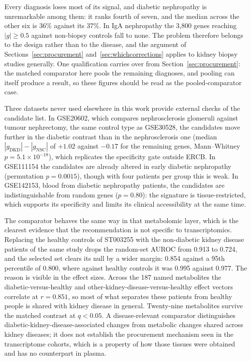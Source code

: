 \documentclass[pdflatex,sn-vancouver-num]{sn-jnl}
\theoremstyle{thmstyleone}
\theoremstyle{thmstyletwo}
\theoremstyle{thmstylethree}
\begin{document}
Every diagnosis loses most of its signal, and diabetic nephropathy is unremarkable among them:
it ranks fourth of seven, and the median across the other six is 36\% against its 37\%. In IgA
nephropathy the 3,800 genes reaching $|g| \ge 0.5$ against non-biopsy controls fall to none.
The problem therefore belongs to the design rather than to the disease, and the argument of
Sections~\ref{sec:procurement} and~\ref{sec:whichcorrections} applies to kidney biopsy studies
generally. One qualification carries over from Section~\ref{sec:procurement}: the matched
comparator here pools the remaining diagnoses, and pooling can itself produce a result, so these
figures should be read as the pooled-comparator case.

Three datasets never used elsewhere in this work provide external checks of the candidate list.
In GSE20602, which compares nephrosclerosis glomeruli against tumour nephrectomy, the same
control type as GSE30528, the candidates move further in the diabetic contrast than in the
nephrosclerosis one (median $|g_{\text{DKD}}| - |g_{\text{NSC}}|$ of $+1.02$ against $-0.17$ for
the remaining genes, Mann--Whitney $p = 5.1 \times 10^{-18}$), which replicates the specificity
gate outside ERCB. In GSE111154 the candidates are already altered in early diabetic nephropathy
(permutation $p = 0.0015$), though with four patients per group this is weak. In GSE142153, blood
from diabetic nephropathy patients, the candidates are indistinguishable from random genes
($p = 0.80$): the signature is tissue-restricted, which supports its specificity and limits its
clinical accessibility at the same time.

The comparator behaves the same way in that metabolomic layer, which is the clearest
evidence that the recommendation is not specific to transcriptomics. Replacing the healthy
controls of ST003255 with the non-diabetic kidney disease patients of the same study drops the
random-set AUROC from 0.913 to 0.724, and the selected set clears its null by a wider
margin: 0.854 against a 95th percentile of 0.800, where against healthy controls it was
0.995 against 0.977. The reason is visible in the effect sizes. Across the 187 named metabolites the
diabetic-versus-healthy and other-kidney-disease-versus-healthy effect vectors correlate at
$r = 0.851$, so most of what separates these patients from healthy people is shared with kidney
disease in general. Twenty-nine metabolites survive the matched contrast at $q < 0.05$. A
disease-relevant comparator distinguishes diabetic-kidney-disease-associated changes from
metabolic changes shared across kidney diseases; it does not establish the procurement
mechanism seen in the transcriptome cohorts, which is a property of how those tissues
were obtained and has no counterpart in plasma.
\end{document}
